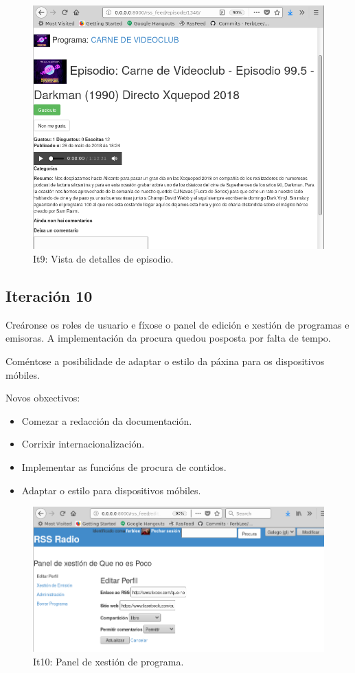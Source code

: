 \begin{figure}[h]
	\centering
	\includegraphics[scale=0.5,keepaspectratio=true]{./images/episode_detail_final.png}
	\caption{It9: Vista de detalles de episodio.}
	\label{fig:episode_detail_final}
\end{figure}


\subsection{Iteración 10}

Creáronse os roles de usuario e fíxose o panel de edición e xestión de programas e emisoras. A implementación da procura quedou posposta por falta de tempo.

Coméntose a posibilidade de adaptar o estilo da páxina para os dispositivos móbiles.

Novos obxectivos:
\begin{itemize}
	\item Comezar a redacción da documentación.
	\item Corrixir internacionalización.
	\item Implementar as funcións de procura de contidos.
	\item Adaptar o estilo para dispositivos móbiles.
\end{itemize}

\begin{figure}[h]
	\centering
	\includegraphics[scale=0.5,keepaspectratio=true]{./images/xestion_final.png}
	\caption{It10: Panel de xestión de programa.}
	\label{fig:xestionl_final}
\end{figure}


